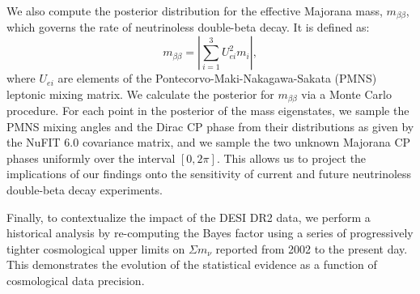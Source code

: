\documentclass[]{article}
\begin{document}
We also compute the posterior distribution for the effective Majorana mass, $m_{\beta\beta}$, which governs the rate of neutrinoless double-beta decay. It is defined as:
\begin{equation}
m_{\beta\beta} = \left| \sum_{i=1}^{3} U_{ei}^2 m_i \right|,
\end{equation}
where $U_{ei}$ are elements of the Pontecorvo-Maki-Nakagawa-Sakata (PMNS) leptonic mixing matrix. We calculate the posterior for $m_{\beta\beta}$ via a Monte Carlo procedure. For each point in the posterior of the mass eigenstates, we sample the PMNS mixing angles and the Dirac CP phase from their distributions as given by the NuFIT 6.0 covariance matrix, and we sample the two unknown Majorana CP phases uniformly over the interval $[0, 2\pi]$. This allows us to project the implications of our findings onto the sensitivity of current and future neutrinoless double-beta decay experiments.

Finally, to contextualize the impact of the DESI DR2 data, we perform a historical analysis by re-computing the Bayes factor using a series of progressively tighter cosmological upper limits on $\Sigma m_\nu$ reported from 2002 to the present day. This demonstrates the evolution of the statistical evidence as a function of cosmological data precision.
\end{document}
